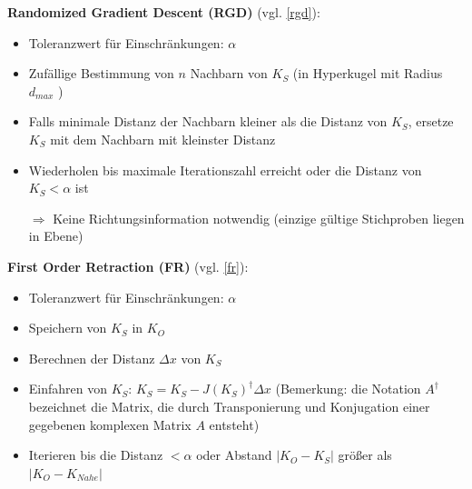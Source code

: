 \textbf{Randomized Gradient Descent (RGD)} (vgl. \autoref{rgd}):
\begin{itemize}
\item Toleranzwert für Einschränkungen: $\alpha$
\item Zufällige Bestimmung von $n$ Nachbarn von $K_S$ (in Hyperkugel mit Radius $d_{max}$ )
\item Falls minimale Distanz der Nachbarn kleiner als die Distanz von $K_S$, ersetze $K_S$ mit dem Nachbarn mit kleinster Distanz
\item Wiederholen bis maximale Iterationszahl erreicht oder die Distanz von $K_S < \alpha$ ist
\item[$\Rightarrow$] Keine Richtungsinformation notwendig (einzige gültige Stichproben liegen in Ebene)
\end{itemize}
\textbf{First Order Retraction (FR)} (vgl. \autoref{fr}):
\begin{itemize}
\item Toleranzwert für Einschränkungen: $\alpha$
\item Speichern von $K_S$ in $K_O$
\item Berechnen der Distanz $\Delta x$ von $K_S$
\item \glqq Einfahren\grqq{} von $K_S$: $K_S = K_S - J(K_S)^\dagger \Delta x$ (Bemerkung: die Notation $A^\dagger$ bezeichnet die Matrix, die durch Transponierung und Konjugation einer gegebenen komplexen Matrix $A$ entsteht)
\item Iterieren bis die Distanz $< \alpha$ oder Abstand $|K_O - K_S |$ größer als $|K_O - K_{Nahe}|$
\end{itemize}
